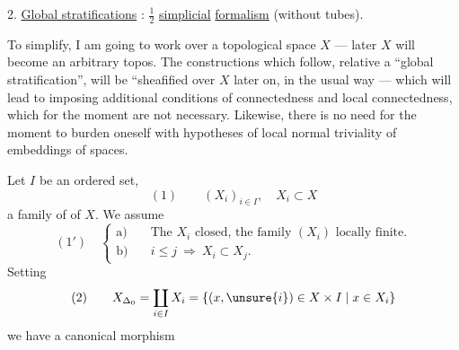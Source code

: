2. \uline{Global stratifications} : $\frac12$ \uline{simplicial} \uline{formalism}
(without tubes).

To simplify, I am going to work over a
topological space $X$ --- later $X$
will become an arbitrary topos. The constructions
which follow, relative  a ``global
stratification'', will be ``sheafified over $X$
later on, in the usual way ---
which will  lead to imposing additional
conditions of connectedness and
local connectedness, which for the moment
are not necessary. Likewise, there is
no need for the moment to burden oneself
with hypotheses of local normal triviality
of embeddings of spaces.

Let $I$ be an ordered set, 
\[
(1)\qquad (X_i)_{i\in I},\quad X_i\subset X
\]
a family of  of $X$. We assume
\[
(1')\quad\left\{\begin{aligned}
\text{a)}\quad&\text{The }X_i\text{ closed, the family }(X_i)\text{ locally finite.}\\
\text{b)}\quad&i\leq j\ \Longrightarrow\ X_i\subset X_j.
\end{aligned}\right.
\]
Setting
\[
(2)\qquad X_{\Delta_0}=\coprod_{i\in I}X_i
=\{(x,\unsure{i})\in X\times I\mid x\in X_i\}
\]
we have a canonical morphism
